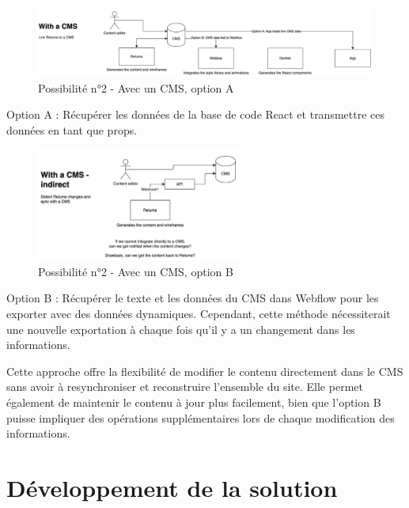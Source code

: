\begin{figure}[h] 
  \centering
  \includegraphics[width=1\textwidth]{Includes/Images/connection2.png}
  \caption{Possibilité n°2 - Avec un CMS, option A}
  \label{fig: Possibilité n°2 - Avec un CMS, option A}
\end{figure} 

Option A : Récupérer les données de la base de code React et transmettre ces données en tant que props.

\begin{figure}[h] 
  \centering
  \includegraphics[width=0.6\textwidth]{Includes/Images/connection3.png}
  \caption{Possibilité n°2 - Avec un CMS, option B}
  \label{fig: Possibilité n°2 - Avec un CMS, option B}
\end{figure} 

Option B : Récupérer le texte et les données du CMS dans Webflow pour les exporter avec des données dynamiques. Cependant, cette méthode nécessiterait une nouvelle exportation à chaque fois qu'il y a un changement dans les informations.

Cette approche offre la flexibilité de modifier le contenu directement dans le CMS sans avoir à resynchroniser et reconstruire l'ensemble du site. Elle permet également de maintenir le contenu à jour plus facilement, bien que l'option B puisse impliquer des opérations supplémentaires lors de chaque modification des informations.

\section{Développement de la solution}

